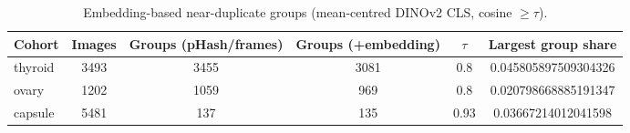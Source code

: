 \begin{table}[H]\centering\small
\caption{Embedding-based near-duplicate groups (mean-centred DINOv2 CLS, cosine $\ge\tau$).}\label{tab:embg}
\begin{tabular}{lccccc}\toprule
Cohort & Images & Groups (pHash/frames) & Groups (+embedding) & $\tau$ & Largest group share \\\midrule
thyroid & 3493 & 3455 & 3081 & 0.8 & 0.045805897509304326 \\
ovary & 1202 & 1059 & 969 & 0.8 & 0.020798668885191347 \\
capsule & 5481 & 137 & 135 & 0.93 & 0.03667214012041598 \\
\bottomrule\end{tabular}\end{table}
